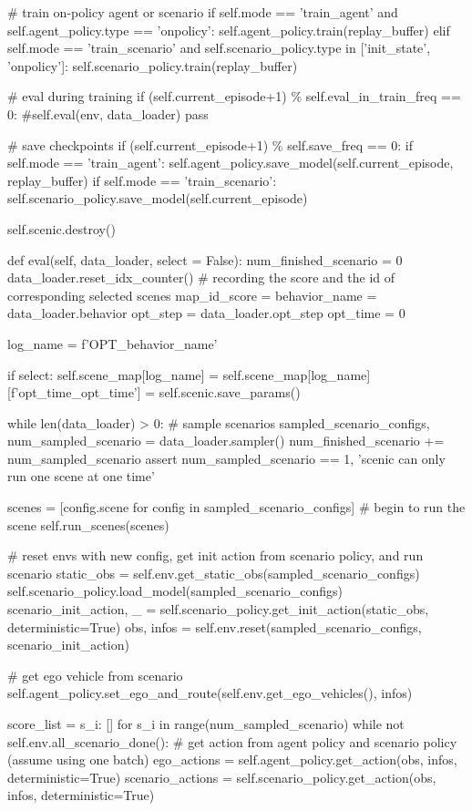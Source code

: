 \begin{appendix}
\# train on-policy agent or scenario
if self.mode == 'train\_agent' and self.agent\_policy.type == 'onpolicy':
self.agent\_policy.train(replay\_buffer)
elif self.mode == 'train\_scenario' and self.scenario\_policy.type in ['init\_state', 'onpolicy']:
self.scenario\_policy.train(replay\_buffer)

\# eval during training
if (self.current\_episode+1) \% self.eval\_in\_train\_freq == 0:
\#self.eval(env, data\_loader)
pass

\# save checkpoints
if (self.current\_episode+1) \% self.save\_freq == 0:
if self.mode == 'train\_agent':
self.agent\_policy.save\_model(self.current\_episode, replay\_buffer)
if self.mode == 'train\_scenario':
self.scenario\_policy.save\_model(self.current\_episode)

self.scenic.destroy()

def eval(self, data\_loader, select = False):
num\_finished\_scenario = 0
data\_loader.reset\_idx\_counter()
\# recording the score and the id of corresponding selected scenes
map\_id\_score = {}
behavior\_name = data\_loader.behavior
opt\_step = data\_loader.opt\_step
opt\_time = 0

log\_name = f'OPT\_{behavior\_name}'

if select:
self.scene\_map[log\_name] = {}
self.scene\_map[log\_name][f'opt\_time\_{opt\_time}'] = self.scenic.save\_params()

while len(data\_loader) > 0:
\# sample scenarios
sampled\_scenario\_configs, num\_sampled\_scenario = data\_loader.sampler()
num\_finished\_scenario += num\_sampled\_scenario
assert num\_sampled\_scenario == 1, 'scenic can only run one scene at one time'

scenes = [config.scene for config in sampled\_scenario\_configs]
\# begin to run the scene
self.run\_scenes(scenes)

\# reset envs with new config, get init action from scenario policy, and run scenario
static\_obs = self.env.get\_static\_obs(sampled\_scenario\_configs)
self.scenario\_policy.load\_model(sampled\_scenario\_configs)
scenario\_init\_action, \_ = self.scenario\_policy.get\_init\_action(static\_obs, deterministic=True)
obs, infos = self.env.reset(sampled\_scenario\_configs, scenario\_init\_action)

\# get ego vehicle from scenario
self.agent\_policy.set\_ego\_and\_route(self.env.get\_ego\_vehicles(), infos)

score\_list = {s\_i: [] for s\_i in range(num\_sampled\_scenario)}
while not self.env.all\_scenario\_done():
\# get action from agent policy and scenario policy (assume using one batch)
ego\_actions = self.agent\_policy.get\_action(obs, infos, deterministic=True)
scenario\_actions = self.scenario\_policy.get\_action(obs, infos, deterministic=True)


\end{appendix}
